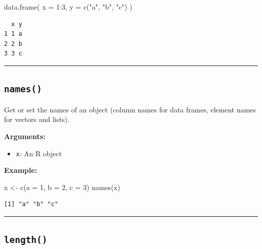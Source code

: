 \documentclass[
  letterpaper,
  DIV=11,
  numbers=noendperiod]{scrreprt}
\newenvironment{Shaded}{\begin{snugshade}}{\end{snugshade}}
\newcommand{\AttributeTok}[1]{\textcolor[rgb]{0.40,0.45,0.13}{#1}}
\newcommand{\DecValTok}[1]{\textcolor[rgb]{0.68,0.00,0.00}{#1}}
\newcommand{\FunctionTok}[1]{\textcolor[rgb]{0.28,0.35,0.67}{#1}}
\newcommand{\NormalTok}[1]{\textcolor[rgb]{0.00,0.23,0.31}{#1}}
\newcommand{\OtherTok}[1]{\textcolor[rgb]{0.00,0.23,0.31}{#1}}
\newcommand{\SpecialCharTok}[1]{\textcolor[rgb]{0.37,0.37,0.37}{#1}}
\newcommand{\StringTok}[1]{\textcolor[rgb]{0.13,0.47,0.30}{#1}}
\providecommand{\tightlist}{%
  \setlength{\itemsep}{0pt}\setlength{\parskip}{0pt}}
\begin{document}
\begin{Shaded}
\begin{Highlighting}[]
\FunctionTok{data.frame}\NormalTok{(}
  \AttributeTok{x =} \DecValTok{1}\SpecialCharTok{:}\DecValTok{3}\NormalTok{,}
  \AttributeTok{y =} \FunctionTok{c}\NormalTok{(}\StringTok{"a"}\NormalTok{, }\StringTok{"b"}\NormalTok{, }\StringTok{"c"}\NormalTok{)}
\NormalTok{)}
\end{Highlighting}
\end{Shaded}

\begin{verbatim}
  x y
1 1 a
2 2 b
3 3 c
\end{verbatim}

\begin{center}\rule{0.5\linewidth}{0.5pt}\end{center}

\subsection{\texorpdfstring{\texttt{names()}}{names()}}\label{names}

Get or set the names of an object (column names for data frames, element
names for vectors and lists).

\textbf{Arguments:}

\begin{itemize}
\tightlist
\item
  \texttt{x}: An R object
\end{itemize}

\textbf{Example:}

\begin{Shaded}
\begin{Highlighting}[]
\NormalTok{x }\OtherTok{\textless{}{-}} \FunctionTok{c}\NormalTok{(}\AttributeTok{a =} \DecValTok{1}\NormalTok{, }\AttributeTok{b =} \DecValTok{2}\NormalTok{, }\AttributeTok{c =} \DecValTok{3}\NormalTok{)}
\FunctionTok{names}\NormalTok{(x)}
\end{Highlighting}
\end{Shaded}

\begin{verbatim}
[1] "a" "b" "c"
\end{verbatim}

\begin{center}\rule{0.5\linewidth}{0.5pt}\end{center}

\subsection{\texorpdfstring{\texttt{length()}}{length()}}\label{length}
\end{document}
